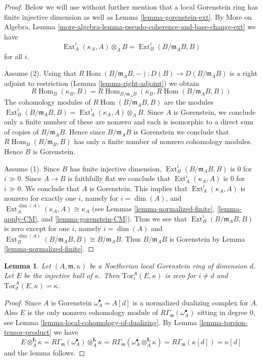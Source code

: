 \documentclass{stacks-project}
\theoremstyle{plain}
\newtheorem{lemma}[subsection]{Lemma}
\theoremstyle{definition}
\theoremstyle{remark}
\numberwithin{equation}{subsection}
\def\Hom{\mathop{\mathrm{Hom}}\nolimits}
\def\Ext{\mathop{\mathrm{Ext}}\nolimits}
\begin{document}
\begin{proof}
Below we will use without further mention that a local Gorenstein ring
has finite injective dimension as well as Lemma \ref{lemma-gorenstein-ext}.
By More on Algebra, Lemma
\ref{more-algebra-lemma-pseudo-coherence-and-base-change-ext}
we have
$$
\Ext^i_A(\kappa_A, A) \otimes_A B =
\Ext^i_B(B/\mathfrak m_A B, B)
$$
for all $i$.

\medskip\noindent
Assume (2). Using that
$R\Hom(B/\mathfrak m_A B, -) : D(B) \to D(B/\mathfrak m_A B)$ is a
right adjoint to restriction (Lemma \ref{lemma-right-adjoint}) we obtain
$$
R\Hom_B(\kappa_B, B) =
R\Hom_{B/\mathfrak m_A B}(\kappa_B, R\Hom(B/\mathfrak m_A B, B))
$$
The cohomology modules of $R\Hom(B/\mathfrak m_A B, B)$ are the modules
$\Ext^i_B(B/\mathfrak m_A B, B) =
\Ext^i_A(\kappa_A, A) \otimes_A B$.
Since $A$ is Gorenstein, we conclude only a finite number of these are nonzero
and each is isomorphic to a direct sum of copies of $B/\mathfrak m_A B$.
Hence since $B/\mathfrak m_A B$ is Gorenstein we conclude that
$R\Hom_B(B/\mathfrak m_B, B)$ has only a finite number of nonzero
cohomology modules. Hence $B$ is Gorenstein.

\medskip\noindent
Assume (1). Since $B$ has finite injective dimension,
$\Ext^i_B(B/\mathfrak m_A B, B)$ is $0$ for $i \gg 0$.
Since $A \to B$ is faithfully flat
we conclude that $\Ext^i_A(\kappa_A, A)$ is $0$
for $i \gg 0$. We conclude that $A$ is Gorenstein. This implies that
$\Ext^i_A(\kappa_A, A)$ is nonzero for exactly one $i$,
namely for $i = \dim(A)$, and
$\Ext^{\dim(A)}_A(\kappa_A, A) \cong \kappa_A$
(see Lemmas \ref{lemma-normalized-finite}, \ref{lemma-apply-CM}, and
\ref{lemma-gorenstein-CM}).
Thus we see that
$\Ext^i_B(B/\mathfrak m_A B, B)$ is zero except for one $i$,
namely $i = \dim(A)$ and
$\Ext^{\dim(A)}_B(B/\mathfrak m_A B, B) \cong B/\mathfrak m_A B$.
Thus $B/\mathfrak m_A B$ is Gorenstein by
Lemma \ref{lemma-normalized-finite}.
\end{proof}

\begin{lemma}
\label{lemma-tor-injective-hull}
Let $(A, \mathfrak m, \kappa)$ be a Noetherian local Gorenstein ring
of dimension $d$. Let $E$ be the injective hull of $\kappa$. Then
$\text{Tor}_i^A(E, \kappa)$ is zero for $i \not = d$
and $\text{Tor}_d^A(E, \kappa) = \kappa$.
\end{lemma}

\begin{proof}
Since $A$ is Gorenstein $\omega_A^\bullet = A[d]$ is a
normalized dualizing complex for $A$.
Also $E$ is the only nonzero cohomology module of
$R\Gamma_\mathfrak m(\omega_A^\bullet)$ sitting in degree $0$, see
Lemma \ref{lemma-local-cohomology-of-dualizing}.
By Lemma \ref{lemma-torsion-tensor-product} we have
$$
E \otimes_A^\mathbf{L} \kappa =
R\Gamma_\mathfrak m(\omega_A^\bullet) \otimes_A^\mathbf{L} \kappa =
R\Gamma_\mathfrak m(\omega_A^\bullet \otimes_A^\mathbf{L} \kappa) =
R\Gamma_\mathfrak m(\kappa[d]) = \kappa[d]
$$
and the lemma follows.
\end{proof}
\end{document}

